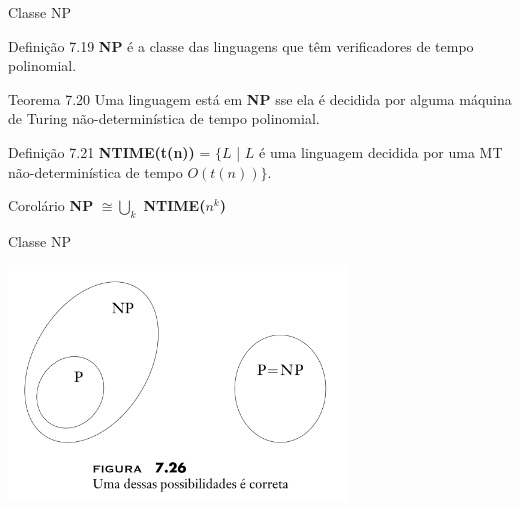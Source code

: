 \documentclass[xcolor=dvipsnames,table]{beamer}
\begin{document}
	\begin{frame}[shrink]{Classe NP}
		\begin{block}{Definição 7.19}
			{\bf NP} é a classe das linguagens que têm verificadores de tempo polinomial.
		\end{block} \pause
		\begin{block}{Teorema 7.20}
			Uma linguagem está em {\bf NP} sse ela é decidida por alguma máquina de Turing não-determinística de tempo polinomial.
		\end{block} \pause
		\begin{block}{Definição 7.21}
			{\bf NTIME(t(n))} = $\{L$ | $L$ é uma linguagem decidida por uma MT não-determinística de tempo $O(t(n)) \}$.
		\end{block} \pause
		\begin{exampleblock}{Corolário}
			{\bf NP} $ \cong \bigcup_k$ {\bf NTIME($n^k$)}
		\end{exampleblock}
	\end{frame}
	
	\begin{frame}{Classe NP}
		\begin{center}
			\includegraphics[width=9cm]{images/pNp.png}
		\end{center}
	\end{frame}		
	
	
	\begin{frame}
		\titlepage
	\end{frame}
	
\end{document}

